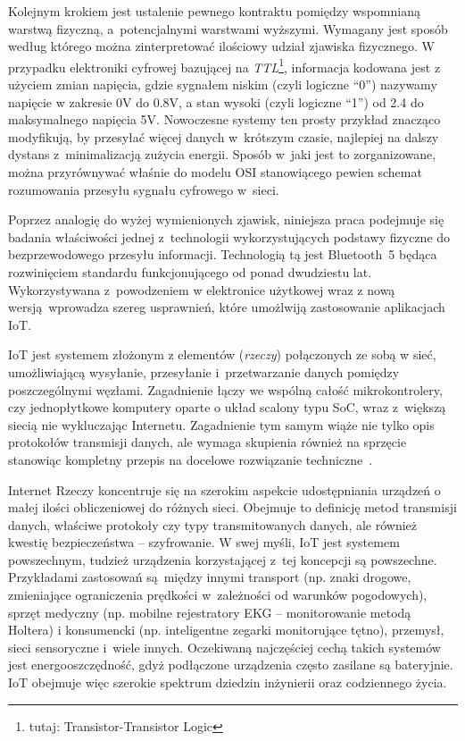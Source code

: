 Kolejnym krokiem jest ustalenie pewnego kontraktu pomiędzy wspomnianą warstwą fizyczną, a~potencjalnymi
warstwami wyższymi. Wymagany jest sposób według którego można zinterpretować ilościowy udział
zjawiska fizycznego. W przypadku elektroniki cyfrowej bazującej na \textit{TTL}\footnote{tutaj: Transistor-Transistor Logic},
informacja kodowana jest z użyciem zmian napięcia, gdzie sygnałem niskim (czyli logiczne \enquote{0}) nazywamy 
napięcie w zakresie 0V do 0.8V, a stan wysoki (czyli logiczne \enquote{1}) od 2.4 do maksymalnego napięcia 5V.
Nowoczesne systemy ten prosty przykład znacząco modyfikują, by przesyłać więcej danych w~krótszym czasie,
najlepiej na dalszy dystans z~minimalizacją zużycia energii. Sposób w~jaki jest to zorganizowane,
można przyrównywać właśnie do modelu \gls{OSI} stanowiącego pewien schemat rozumowania przesyłu sygnału
cyfrowego w~sieci.

Poprzez analogię do wyżej wymienionych zjawisk, niniejsza praca podejmuje się badania właściwości
jednej z~technologii wykorzystujących podstawy fizyczne do bezprzewodowego przesyłu informacji. 
Technologią tą jest Bluetooth~5 będąca rozwinięciem standardu funkcjonującego od ponad dwudziestu lat.
Wykorzystywana z~powodzeniem w elektronice użytkowej wraz z nową wersją wprowadza szereg usprawnień,
które umożlwiją zastosowanie aplikacjach IoT.

\gls{IoT} jest systemem złożonym z elementów (\textit{rzeczy}) połączonych ze sobą w sieć, umożliwiającą
wysyłanie, przesyłanie i~przetwarzanie danych pomiędzy poszczególnymi węzłami. Zagadnienie łączy
we wspólną całość mikrokontrolery, czy jednopłytkowe komputery oparte o układ scalony typu \gls{SoC},
wraz z~większą siecią nie wykluczając Internetu. Zagadnienie tym samym wiąże nie tylko opis protokołów
transmisji danych, ale wymaga skupienia również na sprzęcie stanowiąc
kompletny przepis na docelowe rozwiązanie techniczne~\cite{mcewen_designing_2013}.

Internet Rzeczy koncentruje się na szerokim aspekcie udostępniania urządzeń o małej ilości obliczeniowej
do różnych sieci. Obejmuje to definicję metod transmisji danych, właściwe protokoły czy typy
transmitowanych danych, ale również kwestię bezpieczeństwa -- szyfrowanie. W swej myśli, IoT
jest systemem powszechnym, tudzież urządzenia korzystającej z~tej koncepcji są powszechne.
Przykładami zastosowań są między innymi transport (np. znaki drogowe, zmieniające ograniczenia
prędkości w~zależności od warunków pogodowych), sprzęt medyczny (np. mobilne rejestratory EKG -- monitorowanie
metodą Holtera) i konsumencki (np. inteligentne zegarki monitorujące tętno), przemysł, sieci
sensoryczne i~wiele innych. Oczekiwaną najczęściej cechą takich systemów jest energooszczędność,
gdyż podłączone urządzenia często zasilane są bateryjnie. IoT obejmuje więc szerokie spektrum
dziedzin inżynierii oraz codziennego życia.

